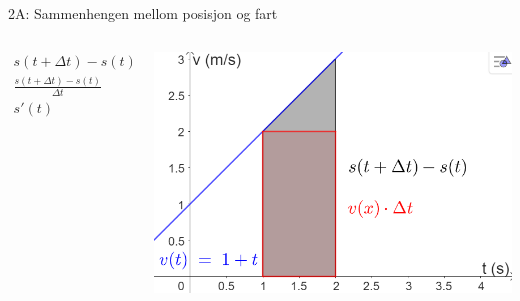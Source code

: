 \greenheader
\begin{frame}{2A: Sammenhengen mellom posisjon og fart}
\begin{columns}[T,onlytextwidth]
   \begin{column}{0.45\textwidth}
    \begin{align*}
      s(t+\Delta t)-s(t) &\approx v(t)\,\Delta t\\[0.8em]
      \frac{s(t+\Delta t)-s(t)}{\Delta t} &\approx v(t)\\[0.8em]
      s'(t) &\approx v(t)
    \end{align*}
  \end{column}
   \begin{column}{0.55\textwidth}
    \centering
    \includegraphics[width=\linewidth]{R2-K2A-5.png}
  \end{column}
\end{columns}
\end{frame}


